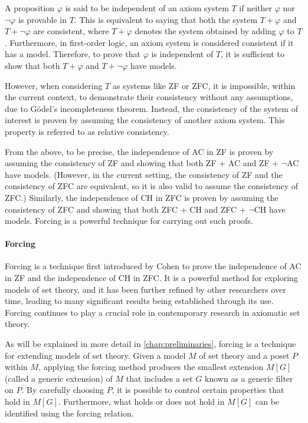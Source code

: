 \documentclass{report}
\begin{document}
A proposition $\varphi$ is said to be independent of an axiom system $T$ if neither $\varphi$ nor $\neg \varphi$ is provable in $T$.
This is equivalent to saying that both the system $T+\varphi$ and $T+\neg \varphi$ are consistent,
where $T+\varphi$ denotes the system obtained by adding $\varphi$ to $T$.
Furthermore, in first-order logic, an axiom system is considered consistent if it has a model.
Therefore, to prove that $\varphi$ is independent of $T$, it is sufficient to show that both $T+\varphi$ and $T+\neg \varphi$ have models.

However, when considering $T$ as systems like ZF or ZFC, it is impossible, within the current context, 
to demonstrate their consistency without any assumptions, due to Gödel's incompleteness theorem. 
Instead, the consistency of the system of interest is proven by assuming the consistency of another axiom system. 
This property is referred to as relative consistency.

From the above, to be precise, the independence of AC in ZF is proven by assuming the consistency of ZF 
and showing that both ZF + AC and ZF + $\neg$AC have models. 
(However, in the current setting, the consistency of ZF and the consistency of ZFC are equivalent, so it is also valid to assume the consistency of ZFC.)
Similarly, the independence of CH in ZFC is proven by assuming the consistency of ZFC 
and showing that both ZFC + CH and ZFC + $\neg$CH have models.
Forcing is a powerful technique for carrying out such proofs.

\paragraph{Forcing}

Forcing is a technique first introduced by Cohen \cite{cohen} to prove the independence of AC in ZF 
and the independence of CH in ZFC. 
It is a powerful method for exploring models of set theory, 
and it has been further refined by other researchers over time, 
leading to many significant results being established through its use. 
Forcing continues to play a crucial role in contemporary research in axiomatic set theory.

As will be explained in more detail in \cref{chap:preliminaries}, 
forcing is a technique for extending models of set theory.
Given a model $M$ of set theory and a poset $P$ within $M$,
applying the forcing method produces the smallest extension $M[G]$ (called a generic extension) of $M$ 
that includes a set $G$ known as a generic filter on $P$.
By carefully choosing $P$, it is possible to control certain properties that hold in $M[G]$.
Furthermore, what holds or does not hold in $M[G]$ can be identified using the forcing relation.
\end{document}

